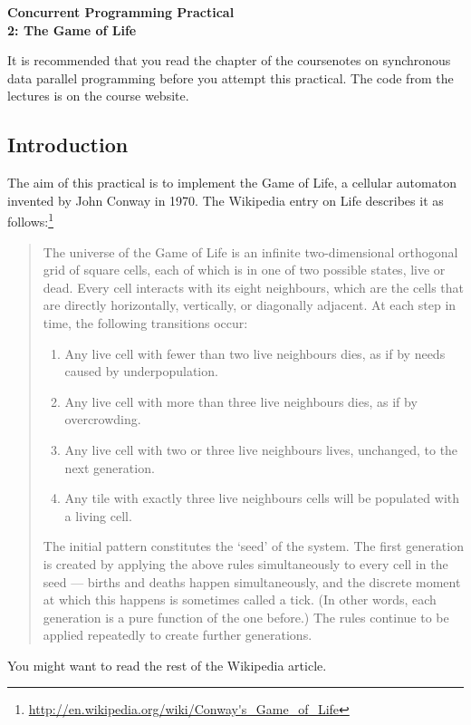 \documentclass{../csopractical}
\begin{document}
\begin{center}
\Large\bf Concurrent Programming Practical 
\\
2: The Game of Life 
\end{center}

It is recommended that you read the chapter of the coursenotes on synchronous
data parallel programming before you attempt this practical.  The code from
the lectures is on the course website.

\subsection*{Introduction}

The aim of this practical is to implement the Game of Life, a cellular
automaton invented by John  Conway in 1970.  The Wikipedia entry on Life
describes it as
follows:\footnote{\url{http://en.wikipedia.org/wiki/Conway's_Game_of_Life}} 
%
\begin{quote}
The universe of the Game of Life is an infinite two-dimensional orthogonal
grid of square cells, each of which is in one of two possible states, live or
dead. Every cell interacts with its eight neighbours, which are the cells that
are directly horizontally, vertically, or diagonally adjacent. At each step in
time, the following transitions occur: 
%
\begin{enumerate}
\item
Any live cell with fewer than two live neighbours dies, as if by needs caused
by underpopulation.

\item
Any live cell with more than three live neighbours dies, as if by overcrowding.

\item
Any live cell with two or three live neighbours lives, unchanged, to the next
generation. 

\item
Any tile with exactly three live neighbours cells will be populated with a
living cell.
\end{enumerate}

The initial pattern constitutes the `seed' of the system. The first generation
is created by applying the above rules simultaneously to every cell in the
seed --- births and deaths happen simultaneously, and the discrete moment at
which this happens is sometimes called a tick. (In other words, each
generation is a pure function of the one before.) The rules continue to be
applied repeatedly to create further generations. 
\end{quote}
%
You might want to read the rest of the Wikipedia article.
\end{document}
